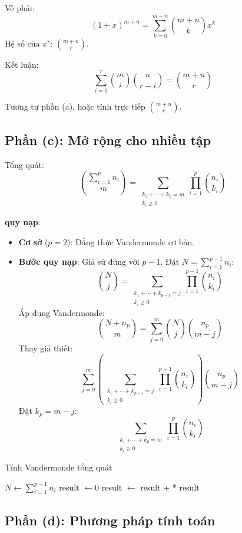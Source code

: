 \documentclass[a4paper,12pt]{article}
\theoremstyle{plain}
\theoremstyle{definition}
\begin{document}
Vế phải:
\[
(1+x)^{m+n} = \sum_{k=0}^{m+n} \binom{m+n}{k}x^k
\]
Hệ số của \( x^r \): \( \binom{m+n}{r} \).

Kết luận:
\[
\sum_{i=0}^r \binom{m}{i}\binom{n}{r-i} = \binom{m+n}{r}
\]

Tương tự phần (a), hoặc tính trực tiếp \( \binom{m+n}{r} \).

\subsection*{Phần (c): Mở rộng cho nhiều tập}

Tổng quát:
\[
\binom{\sum_{i=1}^p n_i}{m} = \sum_{\substack{k_1+\cdots+k_p=m \\ k_i \geq 0}} \prod_{i=1}^p \binom{n_i}{k_i}
\]

\textbf{quy nạp}:
\begin{itemize}
    \item \textbf{Cơ sở} (\( p=2 \)): Đẳng thức Vandermonde cơ bản.
    \item \textbf{Bước quy nạp}: Giả sử đúng với \( p-1 \). Đặt \( N = \sum_{i=1}^{p-1} n_i \):
    \[
    \binom{N}{j} = \sum_{\substack{k_1+\cdots+k_{p-1}=j \\ k_i \geq 0}} \prod_{i=1}^{p-1} \binom{n_i}{k_i}
    \]
    Áp dụng Vandermonde:
    \[
    \binom{N+n_p}{m} = \sum_{j=0}^m \binom{N}{j}\binom{n_p}{m-j}
    \]
    Thay giả thiết:
    \[
    \sum_{j=0}^m \left( \sum_{\substack{k_1+\cdots+k_{p-1}=j \\ k_i \geq 0}} \prod_{i=1}^{p-1} \binom{n_i}{k_i} \right) \binom{n_p}{m-j}
    \]
    Đặt \( k_p = m-j \):
    \[
    \sum_{\substack{k_1+\cdots+k_p=m \\ k_i \geq 0}} \prod_{i=1}^p \binom{n_i}{k_i}
    \]
\end{itemize}

\begin{algorithm}
\caption{Tính Vandermonde tổng quát}
\begin{algorithmic}
     \Return {}
    \EndIf
    \State $N \gets \sum_{i=1}^{p-1} n_i$
    \State result $\gets 0$
        \State result $\gets$ result +  * 
    \EndFor
    \State \Return result
\EndFunction
\end{algorithmic}
\end{algorithm}

\subsection*{Phần (d): Phương pháp tính toán}
\end{document}
